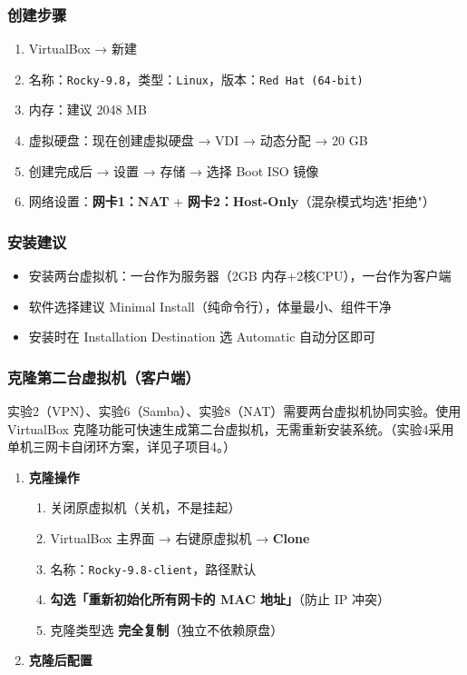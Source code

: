 \documentclass[12pt,a4paper]{ctexart}
\begin{document}
\subsubsection{创建步骤}

\begin{enumerate}[label=\arabic*.,leftmargin=*]
  \item VirtualBox → 新建
  \item 名称：\texttt{Rocky-9.8}，类型：\texttt{Linux}，版本：\texttt{Red Hat (64-bit)}
  \item 内存：建议 2048 MB
  \item 虚拟硬盘：现在创建虚拟硬盘 → VDI → 动态分配 → 20 GB
  \item 创建完成后 → 设置 → 存储 → 选择 Boot ISO 镜像
  \item 网络设置：\textbf{网卡1：NAT} + \textbf{网卡2：Host-Only}（混杂模式均选"拒绝"）
\end{enumerate}

\subsubsection{安装建议}

\begin{itemize}
  \item 安装两台虚拟机：一台作为服务器（2GB 内存+2核CPU），一台作为客户端
  \item 软件选择建议 Minimal Install（纯命令行），体量最小、组件干净
  \item 安装时在 Installation Destination 选 Automatic 自动分区即可
\end{itemize}

\subsubsection{克隆第二台虚拟机（客户端）}

实验2（VPN）、实验6（Samba）、实验8（NAT）需要两台虚拟机协同实验。使用 VirtualBox 克隆功能可快速生成第二台虚拟机，无需重新安装系统。（实验4采用单机三网卡自闭环方案，详见子项目4。）

\begin{enumerate}[label=\arabic*.,leftmargin=*]
  \item \textbf{克隆操作}
  \begin{enumerate}[label=(\arabic*)]
    \item 关闭原虚拟机（关机，不是挂起）
    \item VirtualBox 主界面 → 右键原虚拟机 → \textbf{Clone}
    \item 名称：\texttt{Rocky-9.8-client}，路径默认
    \item \textbf{勾选「重新初始化所有网卡的 MAC 地址」}（防止 IP 冲突）
    \item 克隆类型选 \textbf{完全复制}（独立不依赖原盘）
  \end{enumerate}

  \item \textbf{克隆后配置}
\end{enumerate}
\end{document}
